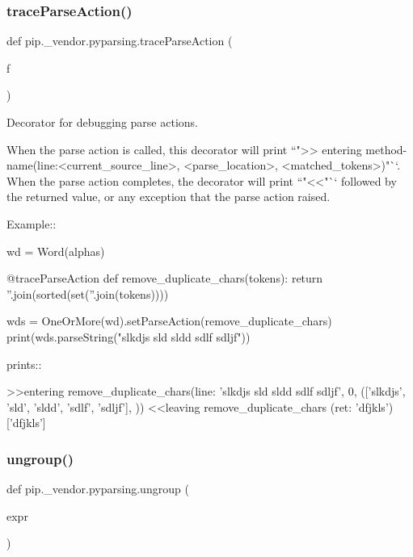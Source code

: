 \subsubsection{\texorpdfstring{trace\+Parse\+Action()}{traceParseAction()}}
{\footnotesize\ttfamily def pip.\+\_\+vendor.\+pyparsing.\+trace\+Parse\+Action (\begin{DoxyParamCaption}\item[{}]{f }\end{DoxyParamCaption})}

\begin{DoxyVerb}Decorator for debugging parse actions.

When the parse action is called, this decorator will print
``">> entering method-name(line:<current_source_line>, <parse_location>, <matched_tokens>)"``.
When the parse action completes, the decorator will print
``"<<"`` followed by the returned value, or any exception that the parse action raised.

Example::

    wd = Word(alphas)

    @traceParseAction
    def remove_duplicate_chars(tokens):
        return ''.join(sorted(set(''.join(tokens))))

    wds = OneOrMore(wd).setParseAction(remove_duplicate_chars)
    print(wds.parseString("slkdjs sld sldd sdlf sdljf"))

prints::

    >>entering remove_duplicate_chars(line: 'slkdjs sld sldd sdlf sdljf', 0, (['slkdjs', 'sld', 'sldd', 'sdlf', 'sdljf'], {}))
    <<leaving remove_duplicate_chars (ret: 'dfjkls')
    ['dfjkls']
\end{DoxyVerb}
 \mbox{\label{namespacepip_1_1__vendor_1_1pyparsing_a4639e2ccbda5a99246c2d3110bc44dd6}} 
\subsubsection{\texorpdfstring{ungroup()}{ungroup()}}
{\footnotesize\ttfamily def pip.\+\_\+vendor.\+pyparsing.\+ungroup (\begin{DoxyParamCaption}\item[{}]{expr }\end{DoxyParamCaption})}

